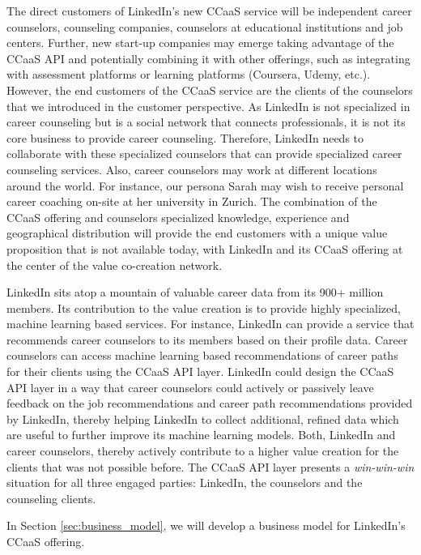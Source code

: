The direct customers of LinkedIn's new CCaaS service will be independent career counselors, counseling companies, 
counselors at educational institutions and job centers. Further, new start-up companies may emerge taking advantage
of the CCaaS API and potentially combining it with other offerings, such as integrating with assessment platforms 
or learning platforms (Coursera, Udemy, etc.). However, the end customers of the CCaaS service are the clients of
the counselors that we introduced in the customer perspective. As LinkedIn is not specialized in career counseling
but is a social network that connects professionals, it is not its core business to provide career counseling.
Therefore, LinkedIn needs to collaborate with these specialized counselors that can provide specialized career
counseling services. Also, career counselors may work at different locations around the world. For instance, our
persona Sarah may wish to receive personal career coaching on-site at her university in Zurich. The combination of
the CCaaS offering and counselors specialized knowledge, experience and geographical distribution will provide
the end customers with a unique value proposition that is not available today, with LinkedIn and its CCaaS offering
at the center of the value co-creation network.

LinkedIn sits atop a mountain of valuable career data from its 900+ million members. Its contribution to the value 
creation is to provide highly specialized, machine learning based services. For instance, LinkedIn can provide a
service that recommends career counselors to its members based on their profile data. Career counselors can access
machine learning based recommendations of career paths for their clients using the CCaaS API layer. LinkedIn could
design the CCaaS API layer in a way that career counselors could actively or passively leave feedback on the job
recommendations and career path recommendations provided by LinkedIn, thereby helping LinkedIn to collect additional,
refined data which are useful to further improve its machine learning models. Both, LinkedIn and career counselors,
thereby actively contribute to a higher value creation for the clients that was not possible before. The CCaaS API
layer presents a \textit{win-win-win} situation for all three engaged parties: LinkedIn, the counselors and the
counseling clients.
\newline

\noindent In Section \ref{sec:business_model}, we will develop a business model for LinkedIn's CCaaS offering.